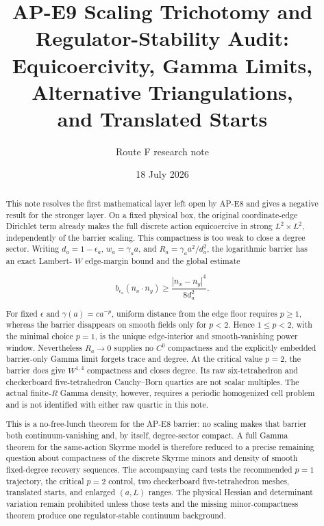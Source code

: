 \documentclass[11pt]{article}
\title{AP-E9 Scaling Trichotomy and Regulator-Stability Audit:\\
Equicoercivity, Gamma Limits, Alternative Triangulations,\\
and Translated Starts}
\author{Route F research note}
\date{18 July 2026}
\numberwithin{equation}{section}
\theoremstyle{definition}
\theoremstyle{remark}
\begin{document}
\maketitle

\begin{abstract}
This note resolves the first mathematical layer left open by AP-E8 and gives
a negative result for the stronger layer.  On a fixed physical box, the
original coordinate-edge Dirichlet term already makes the full discrete
action equicoercive in strong $L^2\times L^2$, independently of the barrier
scaling.  This compactness is too weak to close a degree sector.  Writing
$d_a=1-\epsilon_a$, $w_a=\gamma_a a$, and
$R_a=\gamma_a a^2/d_a^2$, the logarithmic barrier has an exact Lambert-
$W$ edge-margin bound and the global estimate

\[
 b_{\epsilon_a}(n_x\!\cdot n_y)
 \ge \frac{|n_x-n_y|^4}{8d_a^2}.
\]

For fixed $\epsilon$ and $\gamma(a)=c a^{-p}$, uniform distance from the
edge floor requires $p\ge1$, whereas the barrier disappears on smooth
fields only for $p<2$.  Hence $1\le p<2$, with the minimal choice
$p=1$, is the unique edge-interior and smooth-vanishing power window.
Nevertheless $R_a\to0$ supplies no $C^0$ compactness and the explicitly
embedded barrier-only Gamma limit forgets trace and degree.  At the critical
value $p=2$, the barrier does give $W^{1,4}$ compactness and closes degree.
Its raw six-tetrahedron and checkerboard five-tetrahedron Cauchy--Born
quartics are not scalar multiples.  The actual finite-$R$ Gamma density,
however, requires a periodic homogenized cell problem and is not identified
with either raw quartic in this note.

This is a no-free-lunch theorem for the AP-E8 barrier: no scaling makes that
barrier both continuum-vanishing and, by itself, degree-sector compact.  A
full Gamma theorem for the same-action Skyrme model is therefore reduced to
a precise remaining question about compactness of the discrete Skyrme
minors and density of smooth fixed-degree recovery sequences.  The
accompanying card tests the recommended $p=1$ trajectory, the critical
$p=2$ control, two checkerboard five-tetrahedron meshes, translated starts,
and enlarged $(a,L)$ ranges.  The physical Hessian and determinant variation
remain prohibited unless those tests and the missing minor-compactness
theorem produce one regulator-stable continuum background.
\end{abstract}

\tableofcontents
\end{document}
